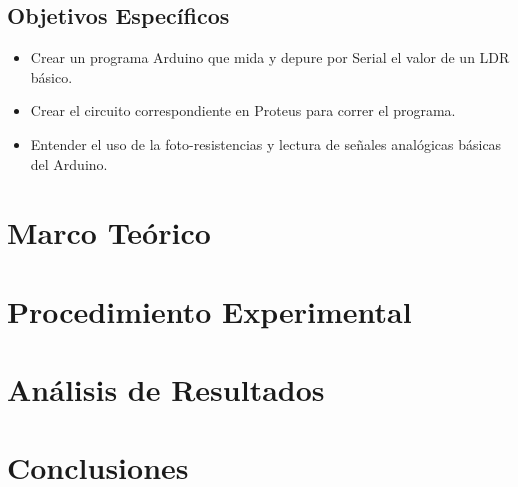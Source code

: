 \documentclass{article}
\begin{document}
    \subsection{Objetivos Específicos}

    \begin{itemize}
        \item Crear un programa Arduino que mida y depure por Serial el valor de un LDR básico.
        \item Crear el circuito correspondiente en Proteus para correr el programa.
        \item Entender el uso de la foto-resistencias y lectura de señales analógicas básicas del Arduino.
    \end{itemize}

    \section{Marco Teórico}

    \section{Procedimiento Experimental}


    \section{Análisis de Resultados}



    \section{Conclusiones}



    \printbibliography
\end{document}
